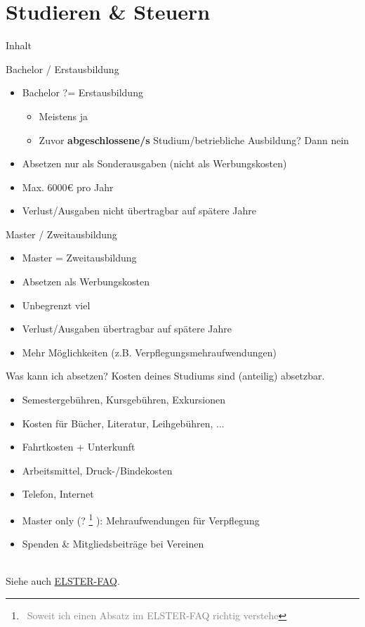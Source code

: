 \documentclass{beamer}
\newcommand{\n}{\hfill\\\vspace{0.25cm}}
\let\oldfootnote\footnote
\renewcommand{\footnote}[1]
{%
	\oldfootnote
	{
		\tiny
		\textcolor{gray}{\ #1}
	}%
}
\begin{document}
	\section{Studieren \& Steuern}
	
		\begin{frame}[t]{Inhalt}
		\end{frame}
	
		\begin{frame}{Bachelor / Erstausbildung}
			\begin{itemize}
				\item Bachelor ?= Erstausbildung
				\begin{itemize}
					\item Meistens ja
					\item Zuvor \textbf{abgeschlossene/s} Studium/betriebliche Ausbildung? Dann nein
				\end{itemize}
				\item Absetzen nur als Sonderausgaben (nicht als Werbungskosten)
				\item Max. 6000€ pro Jahr
				\item Verlust/Ausgaben nicht übertragbar auf spätere Jahre
			\end{itemize}
		\end{frame}
	
		\begin{frame}{Master / Zweitausbildung}
			\begin{itemize}
				\item Master = Zweitausbildung
				\item Absetzen als Werbungskosten
				\item Unbegrenzt viel
				\item Verlust/Ausgaben übertragbar auf spätere Jahre
				\item Mehr Möglichkeiten (z.B. Verpflegungsmehraufwendungen)
			\end{itemize}
		\end{frame}
	
		\begin{frame}{Was kann ich absetzen?}
			Kosten deines Studiums sind (anteilig) absetzbar.\n
			\begin{itemize}
				\item Semestergebühren, Kursgebühren, Exkursionen
				\item Kosten für Bücher, Literatur, Leihgebühren, ...
				\item Fahrtkosten + Unterkunft
				\item Arbeitsmittel, Druck-/Bindekosten
				\item Telefon, Internet
				\item Master only (?\footnote{Soweit ich einen Absatz im ELSTER-FAQ richtig verstehe}): Mehraufwendungen für Verpflegung
				\item Spenden \& Mitgliedsbeiträge bei Vereinen
			\end{itemize}\n
			Siehe auch \href{https://www.elster.de/eportal/helpGlobal?themaGlobal=help_est_ufa_10_2020}{ELSTER-FAQ}.
		\end{frame}
	
\end{document}
